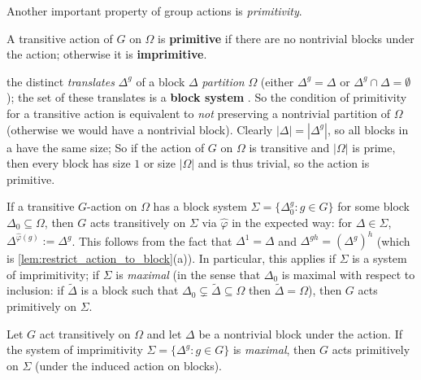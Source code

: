 Another important property of group actions is \textit{primitivity}.

\begin{definition}\label{def:primitive_action}
    A transitive action of $G$ on $\Omega$ is \textbf{primitive} if there are no nontrivial blocks under the action; otherwise it is \textbf{imprimitive}.
\end{definition}

 the distinct \textit{translates} $\Delta^g$ of a block $\Delta$ \textit{partition} $\Omega$ (either $\Delta^g = \Delta$ or $\Delta^g \cap \Delta = \emptyset$); the set  of these translates  is a \textbf{block system} . So the condition of primitivity for a transitive action is equivalent to \textit{not} preserving a nontrivial partition of $\Omega$ (otherwise we would have a nontrivial block). Clearly $|\Delta| = |\Delta^g|$, so all blocks in a  have the same size;  So if the action of $G$ on $\Omega$ is transitive and $|\Omega|$ is prime, then every block has size $1$ or size $|\Omega|$ and is thus trivial, so the action is primitive. 

If a transitive $G$-action on $\Omega$ has a block system $\Sigma = \{\Delta_0^g :  g \in G\}$ for some block $\Delta_0 \subseteq \Omega$, then $G$ acts transitively on $\Sigma$ via $\hat\varphi$ in the expected way: for $\Delta \in \Sigma$, $\Delta^{\hat\varphi(g)} := \Delta^g$. This follows from the fact that $\Delta^1 = \Delta$ and $\Delta^{gh} = (\Delta^g)^h$ (which is \autoref{lem:restrict_action_to_block}(a)). In particular, this applies if $\Sigma$ is a system of imprimitivity; if $\Sigma$ is \textit{maximal} (in the sense that $\Delta_0$ is maximal with respect to inclusion: if $\tilde\Delta$ is a block such that $\Delta_0 \subsetneq \tilde\Delta \subseteq \Omega$ then $\tilde\Delta = \Omega$), then $G$ acts primitively on $\Sigma$.

\begin{lemma}\label{lem:action_on_blocks_primitive_if_maximal}
    Let $G$ act transitively on $\Omega$ and let $\Delta$ be a nontrivial block under the action. If the system of imprimitivity $\Sigma = \{\Delta^g :  g \in G\}$ is \textit{maximal}, then $G$ acts primitively on $\Sigma$ (under the induced action on blocks).
\end{lemma}

